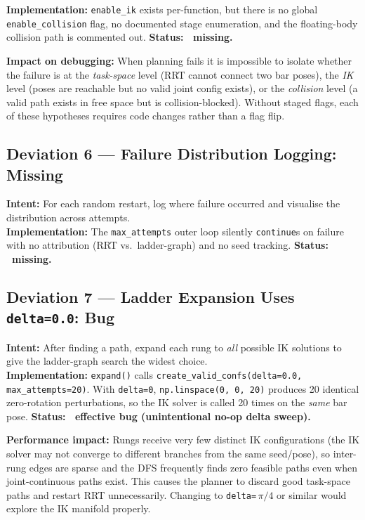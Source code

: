 \documentclass[11pt]{article}
\begin{document}
\textbf{Implementation:} \texttt{enable\_ik} exists per-function, but there is no global
\texttt{enable\_collision} flag, no documented stage enumeration, and the floating-body
collision path is commented out.  \textbf{Status: \texttimes~missing.}

\noindent\textbf{Impact on debugging:} When planning fails it is impossible to isolate
whether the failure is at the \emph{task-space} level (RRT cannot connect two bar poses),
the \emph{IK} level (poses are reachable but no valid joint config exists), or the
\emph{collision} level (a valid path exists in free space but is collision-blocked).
Without staged flags, each of these hypotheses requires code changes rather than a flag flip.

\subsection*{Deviation 6 — Failure Distribution Logging: Missing}

\textbf{Intent:} For each random restart, log where failure occurred and visualise the
distribution across attempts.\\
\textbf{Implementation:} The \texttt{max\_attempts} outer loop silently \texttt{continue}s
on failure with no attribution (RRT vs.\ ladder-graph) and no seed tracking.
\textbf{Status: \texttimes~missing.}

\subsection*{Deviation 7 — Ladder Expansion Uses \texttt{delta=0.0}: Bug}

\textbf{Intent:} After finding a path, expand each rung to \emph{all} possible IK
solutions to give the ladder-graph search the widest choice.\\
\textbf{Implementation:} \texttt{expand()} calls
\texttt{create\_valid\_confs(delta=0.0, max\_attempts=20)}.  With \texttt{delta=0},
\texttt{np.linspace(0,\,0,\,20)} produces 20 identical zero-rotation perturbations,
so the IK solver is called 20 times on the \emph{same} bar pose.
\textbf{Status: \texttimes~effective bug (unintentional no-op delta sweep).}

\noindent\textbf{Performance impact:} Rungs receive very few distinct IK configurations
(the IK solver may not converge to different branches from the same seed/pose), so
inter-rung edges are sparse and the DFS frequently finds zero feasible paths even when
joint-continuous paths exist. This causes the planner to discard good task-space paths
and restart RRT unnecessarily. Changing to \texttt{delta=}\,$\pi/4$ or similar would
explore the IK manifold properly.
\end{document}
